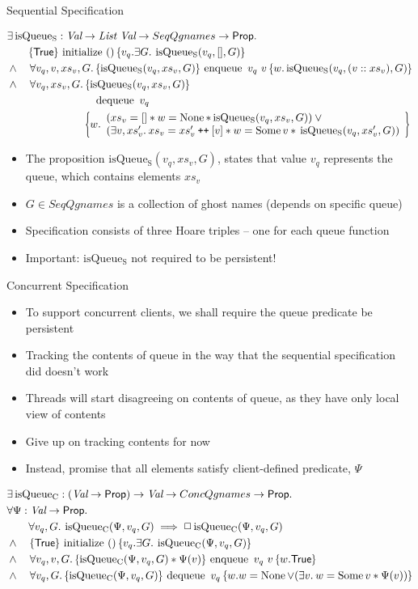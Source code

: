 \documentclass[9pt]{beamer}
\newcommand{\initialise}{\operatorname{initialize}}
\newcommand{\enqueue}{\operatorname{enqueue}}
\newcommand{\dequeue}{\operatorname{dequeue}}
\newcommand{\isqueueseq}{\operatorname{isQueue_{S}}}
\newcommand{\isqueueconc}{\operatorname{isQueue_{C}}}
\newcommand{\SeqQgnames}{SeqQgnames}
\newcommand{\ConcQgnames}{ConcQgnames}
\newcommand{\vq}{v_q}
\newcommand{\nodeval}{\valB}
\newcommand{\absvalue}{\val}
\newcommand{\absvalueList}{xs_v}
\newcommand{\Qg}{G}
\newcommand\catenate{\mathbin{\text{\ttfamily\upshape ++}}}
\newcommand{\seqspecinitHTGen}[2]{\hoare{\TRUE}{\initialise \ \TT}{#1 . \Exists #2. \isqueueseq(#1, [], #2)}}
\newcommand{\seqspecinitGen}[2]{\seqspecinitHTGen{#1}{#2}}
\newcommand{\seqspecinit}{\seqspecinitGen{\vq}{\Qg}}
\newcommand{\seqspecenqHT}[4]{\hoare{\isqueueseq(#1, #3, #4)}{\enqueue \ #1 \ #2}{\valB . \isqueueseq(#1, (#2 :: #3), #4)}}
\newcommand{\seqspecenqGen}[4]{\All #1, #2, #3, #4. \seqspecenqHT{#1}{#2}{#3}{#4}}
\newcommand{\seqspecenq}{\seqspecenqGen{\vq}{\absvalue}{\absvalueList}{\Qg}}
\newcommand{\seqspecdeqHT}[3]{\hoareV[t]{\isqueueseq(#1, #2, #3)}{\dequeue \ #1}{\nodeval . \begin{array}{l}(#2 = [] \star{} \nodeval = \None \star{} \isqueueseq(#1, #2, #3)) \lor{}\\ (\Exists \absvalue, #2' . #2 = #2' \catenate [\absvalue] \star{} \nodeval = \Some \absvalue \star{} \isqueueseq(#1, #2', #3)) \end{array}}}
\newcommand{\seqspecdeqGen}[3]{\All #1, #2, #3. \seqspecdeqHT{#1}{#2}{#3}}
\newcommand{\seqspecdeq}{\seqspecdeqGen{\vq}{\absvalueList}{\Qg}}
\newcommand{\concspecinitHTGen}[3]{\hoare{\TRUE}{\initialise \ \TT}{#2 . \Exists #3. \isqueueconc(#1, #2, #3)}}
\newcommand{\concspecinitGen}[3]{\concspecinitHTGen{#1}{#2}{#3}}
\newcommand{\concspecinit}[1]{\concspecinitGen{#1}{\vq}{\Qg}}
\newcommand{\concspecenqHT}[4]{\hoare{\isqueueconc(#1, #2, #4) \star{} #1(#3)}{\enqueue \ #2 \ #3}{\valB . \TRUE}}
\newcommand{\concspecenqGen}[4]{\All #2, #3, #4. \concspecenqHT{#1}{#2}{#3}{#4}}
\newcommand{\concspecenq}[1]{\concspecenqGen{#1}{\vq}{\absvalue}{\Qg}}
\newcommand{\concspecdeqHT}[3]{\hoare{\isqueueconc(#1, #2, #3)}{\dequeue \ #2}{\nodeval . \nodeval = \None \lor{} (\Exists \absvalue . \nodeval = \Some \absvalue \star{} #1(\absvalue))}}
\newcommand{\concspecdeqGen}[3]{\All #2, #3. \concspecdeqHT{#1}{#2}{#3}}
\newcommand{\concspecdeq}[1]{\concspecdeqGen{#1}{\vq}{\Qg}}
\begin{document}
\begin{frame}{Sequential Specification}
  \begin{definition}\label{QueueSpecs:spec:seq}
    \begin{align*}
      &\Exists \isqueueseq : \Val \to \List ~ \Val \to \SeqQgnames \to \Prop.\\
      &\quad\quad\seqspecinit\\
      &\land{}\quad\seqspecenq\\
      &\land{}\quad\seqspecdeq
    \end{align*}
  \end{definition}
  \begin{itemize}
    \item The proposition $\isqueueseq(\vq, \absvalueList, \Qg)$, states that value $\vq$ represents the queue, which contains elements $\absvalueList$
    \item $G \in \SeqQgnames{}$ is a collection of ghost names (depends on specific queue)
    \item Specification consists of three Hoare triples -- one for each queue function
    \item Important: $\isqueueseq$ not required to be persistent!
  \end{itemize}
\end{frame}

\begin{frame}{Concurrent Specification}
  \begin{itemize}
    \item To support concurrent clients, we shall require the queue predicate be persistent
    \item Tracking the contents of queue in the way that the sequential specification did doesn't work
    \item Threads will start disagreeing on contents of queue, as they have only local view of contents
    \item Give up on tracking contents for now
    \item Instead, promise that all elements satisfy client-defined predicate, $\Psi$
  \end{itemize}
  \begin{definition}\label{QueueSpecs:spec:conc}
    \begin{align*}
      &\Exists \isqueueconc : (\Val \to \Prop) \to \Val \to \ConcQgnames \to \Prop.\\
      &\All \Psi : \Val \to \Prop.\\
      &\quad\quad \All \vq, \Qg . \isqueueconc(\Psi, \vq, \Qg) \implies \persistently \isqueueconc(\Psi, \vq, \Qg)\\
      &\land{}\quad\concspecinit{\Psi}\\
      &\land{}\quad\concspecenq{\Psi}\\
      &\land{}\quad\concspecdeq{\Psi}
    \end{align*}
  \end{definition}
\end{frame}
\end{document}

